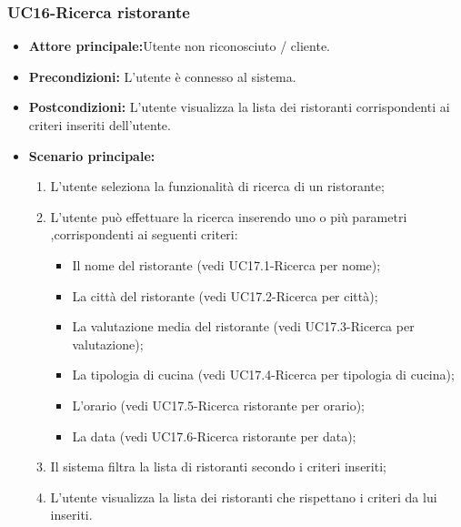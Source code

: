 \subsubsection{UC16-Ricerca ristorante}
\begin{itemize}
\item \textbf{Attore principale:}Utente non riconosciuto / cliente.
\item \textbf{Precondizioni:} L'utente è connesso al sistema.
\item \textbf{Postcondizioni:} L'utente visualizza la lista dei ristoranti corrispondenti ai criteri inseriti
dell'utente.
\item \textbf{Scenario principale:}
\begin{enumerate}
    \item L'utente seleziona la funzionalità di ricerca di un ristorante;
    \item L'utente può effettuare la ricerca inserendo uno o più parametri ,corrispondenti
    ai seguenti criteri:
    \begin{itemize}
        \item Il nome del ristorante (vedi UC17.1-Ricerca per nome);
        \item La città del ristorante (vedi UC17.2-Ricerca per città);
        \item La valutazione media del ristorante (vedi UC17.3-Ricerca per valutazione);
        \item La tipologia di cucina (vedi UC17.4-Ricerca per tipologia di cucina);
        \item L'orario (vedi UC17.5-Ricerca ristorante per orario);
        \item La data (vedi UC17.6-Ricerca ristorante per data);
    \end{itemize}
    \item  Il sistema filtra la lista di ristoranti secondo i criteri inseriti;
    \item L'utente visualizza la lista dei ristoranti che rispettano i criteri da lui inseriti.
\end{enumerate}
\end{itemize}

